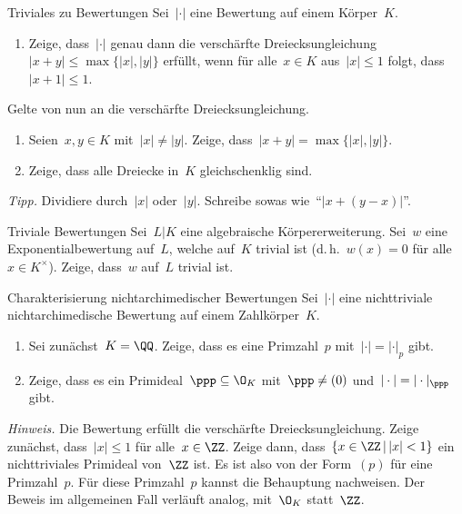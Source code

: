 \documentclass{uebblatt}
\begin{document}

\begin{aufgabe}{Triviales zu Bewertungen}
Sei~$|\cdot|$ eine Bewertung auf einem Körper~$K$.
\begin{enumerate}
\item Zeige, dass~$|\cdot|$ genau dann die verschärfte Dreiecksungleichung~$|x
+ y| \leq \max\{|x|,|y|\}$ erfüllt, wenn für alle~$x \in K$ aus~$|x| \leq 1$
folgt, dass~$|x + 1| \leq 1$.
\end{enumerate}
Gelte von nun an die verschärfte Dreiecksungleichung.
\begin{enumerate}
\addtocounter{enumi}{1}
\item Seien~$x,y \in K$ mit~$|x| \neq |y|$. Zeige, dass~$|x + y| = \max\{ |x|, |y| \}$.
\item Zeige, dass alle Dreiecke in~$K$ gleichschenklig sind.
\end{enumerate}
{\tiny\emph{Tipp.} Dividiere durch~$|x|$ oder~$|y|$. Schreibe sowas wie~"`$|x +
(y - x)|$"'.\par}
\end{aufgabe}

\begin{aufgabe}{Triviale Bewertungen}
Sei~$L|K$ eine algebraische Körpererweiterung. Sei~$w$ eine
Exponentialbewertung auf~$L$, welche auf~$K$ trivial ist (d.\,h.~$w(x) = 0$ für
alle~$x \in K^\times$). Zeige, dass~$w$ auf~$L$ trivial ist.
\end{aufgabe}

\begin{aufgabe}{Charakterisierung nichtarchimedischer Bewertungen}
Sei~$|\cdot|$ eine nichttriviale nichtarchimedische Bewertung auf einem Zahlkörper~$K$.
\begin{enumerate}
\item Sei zunächst~$K = \QQ$. Zeige, dass es eine Primzahl~$p$ mit~$|\cdot| =
|\cdot|_p$ gibt.
\item Zeige, dass es ein Primideal~$\ppp \subseteq \O_K$ mit~$\ppp \neq (0)$
und~$|\cdot| = |\cdot|_\ppp$ gibt.
\end{enumerate}
{\tiny\emph{Hinweis.} Die Bewertung erfüllt die verschärfte
Dreiecksungleichung. Zeige zunächst, dass~$|x| \leq 1$ für alle~$x \in \ZZ$.
Zeige dann, dass~$\{ x \in \ZZ \,|\, |x| < 1 \}$ ein nichttriviales Primideal
von~$\ZZ$ ist. Es ist also von der Form~$(p)$ für eine Primzahl~$p$. Für diese
Primzahl~$p$ kannst die Behauptung nachweisen. Der Beweis im allgemeinen Fall
verläuft analog, mit~$\O_K$ statt~$\ZZ$.\par}
\end{aufgabe}
\end{document}
